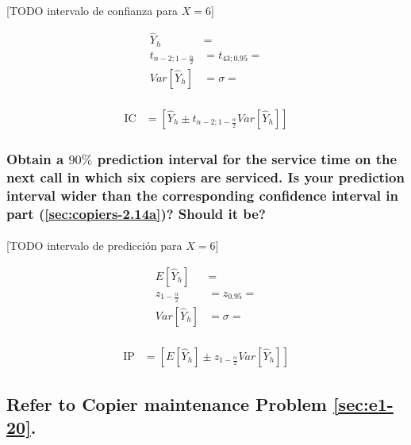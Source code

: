 \documentclass{article}
\begin{document}
        \paragraph{}
        [TODO intervalo de confianza para $X=6$]

        \begin{align}
          \widehat{Y}_h &= \\
          t_{n-2;1-\frac{\alpha}{2}} &= t_{43;0.95} = \\
          Var\left[\widehat{Y}_h \right] &= \sigma = \\
        \end{align}

        \begin{align}
          \text{IC} &= \left[\widehat{Y}_h \pm t_{n-2;1-\frac{\alpha}{2}}Var\left[\widehat{Y}_h \right]\right]
        \end{align}

      \subsubsection{Obtain a $90\%$ prediction interval for the service time on the next call in which six copiers are serviced. Is your prediction interval wider than the corresponding confidence interval in part (\ref{sec:copiers-2.14a})? Should it be?}

        \paragraph{}
        [TODO intervalo de predicción para $X=6$]

        \begin{align}
          E\left[\widehat{Y}_h\right] &= \\
          z_{1-\frac{\alpha}{2}} &= z_{0.95} = \\
          Var\left[\widehat{Y}_h\right] &= \sigma = \\
        \end{align}

        \begin{align}
          \text{IP} &= \left[E\left[\widehat{Y}_h\right] \pm z_{1-\frac{\alpha}{2}}Var\left[\widehat{Y}_h\right]\right]
        \end{align}


    \setcounter{subsection}{23}
    \subsection{Refer to \textbf{Copier maintenance} Problem \ref{sec:e1-20}.}
\end{document}
